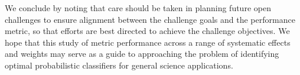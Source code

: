 
We conclude by noting that care should be taken in planning future open challenges to ensure alignment between the challenge goals and the performance metric, so that efforts are best directed to achieve the challenge objectives. We hope that this study of metric performance across a range of systematic effects and weights may serve as a guide to approaching the problem of identifying optimal probabilistic classifiers for general science applications.
